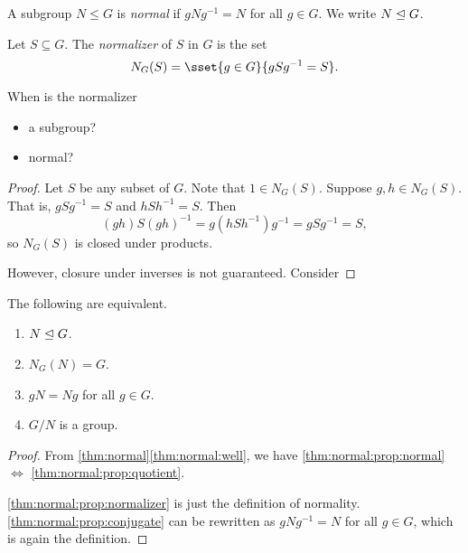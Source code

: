 \begin{definition*} \label{def:normal}
    A subgroup $N \le G$ is \emph{normal} if $gNg^{-1} = N$
    for all $g \in G$.
    We write $N \trianglelefteq G$.
\end{definition*}

\begin{definition*}[normalizer] \label{def:normal:normalizer}
    Let $S \subseteq G$.
    The \emph{normalizer} of $S$ in $G$ is the set \[
        N_G(S) = \sset{g \in G}{gSg^{-1} = S}.
    \]
\end{definition*}

\begin{exercise}[self]
    When is the normalizer
    \begin{itemize}
        \item a subgroup?
        \item normal?
    \end{itemize}
\end{exercise}
\begin{proof}
    Let $S$ be any subset of $G$.
    Note that $1 \in N_G(S)$.
    Suppose $g, h \in N_G(S)$.
    That is, $gSg^{-1} = S$ and $hSh^{-1} = S$.
    Then \[
        (gh)S(gh)^{-1} = g(hSh^{-1})g^{-1} = gSg^{-1} = S,
    \] so $N_G(S)$ is closed under products.

    However, closure under inverses is not guaranteed.
    Consider
\end{proof}

\begin{exercise} \label{thm:normal:prop}
    The following are equivalent.
    \begin{enumerate}
        \item \label{thm:normal:prop:normal}
            $N \trianglelefteq G$.
        \item \label{thm:normal:prop:normalizer}
            $N_G(N) = G$.
        \item \label{thm:normal:prop:conjugate}
            $gN = Ng$ for all $g \in G$.
        \item \label{thm:normal:prop:quotient}
            $G/N$ is a group.
    \end{enumerate}
\end{exercise}
\begin{proof}
    From \cref{thm:normal}\ref{thm:normal:well}, we have
    \ref{thm:normal:prop:normal} $\iff$
    \ref{thm:normal:prop:quotient}.

    \ref{thm:normal:prop:normalizer} is just the definition of normality.
    \ref{thm:normal:prop:conjugate} can be rewritten as $gNg^{-1} = N$
    for all $g \in G$, which is again the definition.
\end{proof}

